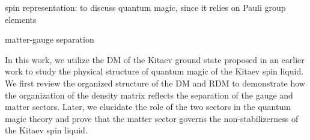 {\alert{spin representation: to discuss quantum magic, since it relies on Pauli group elements}

\alert{matter-gauge separation}

In this work, we utilize the DM of the Kitaev ground state proposed in an earlier work \cite{wang2026exactorganizationdensitymatrices} to study the physical structure of quantum magic of the Kitaev spin liquid. We first review the organized structure of the DM and RDM to demonstrate how the organization of the density matrix reflects the separation of the gauge and matter sectors. Later, we elucidate the role of the two sectors in the quantum magic theory and prove that the matter sector governs the non-stabilizerness of the Kitaev spin liquid. 
}

